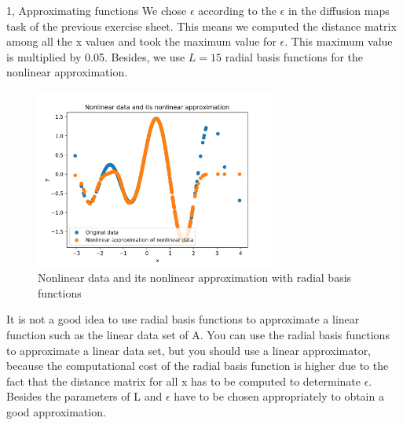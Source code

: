 \documentclass[10pt,a4paper]{article}
\begin{document}
\begin{task}{1, Approximating functions}
We chose $\epsilon$ according to the $\epsilon$ in the diffusion maps task of the previous exercise sheet. This means we computed the distance matrix among all the x values and took the maximum value for $\epsilon$. This maximum value is multiplied by 0.05. Besides, we use $L=15$ radial basis functions for the nonlinear approximation.
\begin{figure}[H]
\centering
\includegraphics[width=0.7\textwidth]{../plots/task1_part3_eps.png}
\caption{Nonlinear data and its nonlinear approximation with radial basis functions}
\label{fig:task1_3}
\end{figure}
It is not a good idea to use radial basis functions to approximate a linear function such as the linear data set of A. You can use the radial basis functions to approximate a linear data set, but you should use a linear approximator, because the computational cost of the radial basis function is higher due to the fact that the distance matrix for all x has to be computed to determinate $\epsilon$. Besides the parameters of L and $\epsilon$ have to be chosen appropriately to obtain a good approximation.
\end{task}
\end{document}
